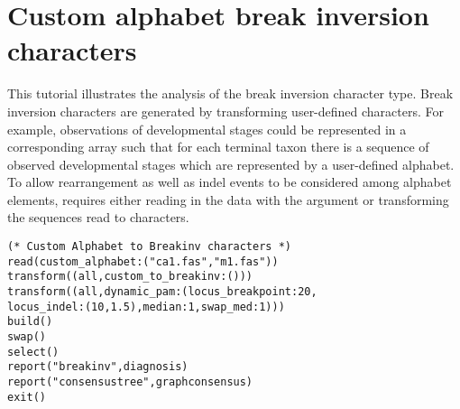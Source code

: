\section{Custom alphabet break inversion characters}{\label{tutorial4.8}}

This tutorial illustrates the analysis of the break inversion character type.  Break inversion characters are generated by transforming user-defined  characters.  
For example, observations of developmental stages could be represented in a corresponding array such that for each terminal taxon there is a sequence of observed developmental stages which are represented by a user-defined alphabet.  To allow rearrangement as well as indel events to be considered among alphabet elements, requires either reading in the data with the  argument or transforming the  sequences read to  characters. 

\begin{verbatim}
(* Custom Alphabet to Breakinv characters *)
read(custom_alphabet:("ca1.fas","m1.fas"))
transform((all,custom_to_breakinv:()))
transform((all,dynamic_pam:(locus_breakpoint:20,
locus_indel:(10,1.5),median:1,swap_med:1)))
build()
swap()
select()
report("breakinv",diagnosis)
report("consensustree",graphconsensus)
exit()
\end{verbatim}

